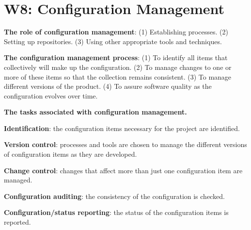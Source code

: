 
\section{W8: Configuration Management}

\textbf{The role of configuration management}: (1) Establishing processes. (2) Setting up repositories. (3) Using other appropriate tools and techniques.

\textbf{The configuration management process}: (1) To identify all items that collectively will make up the configuration. (2) To manage changes to one or more of these items so that the collection remains consistent. (3) To manage different versions of the product. (4) To assure software quality as the configuration evolves over time.

\textbf{The tasks associated with configuration management.}

    \textbf{Identification}: the configuration items necessary for the project are identified.

    \textbf{Version control}: processes and tools are chosen to manage the different versions of configuration items as they are developed.

    \textbf{Change control}: changes that affect more than just one configuration item are managed.

    \textbf{Configuration auditing}: the consistency of the configuration is checked.

    \textbf{Configuration/status reporting}: the status of the configuration items is reported.

